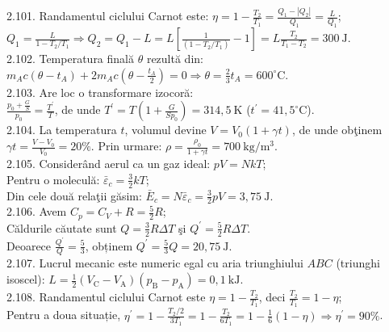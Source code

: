 2.101. Randamentul ciclului Carnot este: $\eta=1-\frac{T_{2}}{T_{1}}=\frac{Q_{1}-\left|Q_{2}\right|}{Q_{1}}=\frac{L}{Q_{1}}$;\\ $Q_{1}=\frac{L}{1-T_{2} / T_{1}} \Rightarrow Q_{2}=Q_{1}-L=L\left[\frac{1}{\left(1-T_{2} / T_{1}\right)}-1\right]=L \frac{T_{2}}{T_{1}-T_{2}}=300 \mathrm{~J}$.\\

2.102. Temperatura finală $\theta$ rezultă din:\\ $m_{A} c\left(\theta-t_{A}\right)+2 m_{A} c\left(\theta-\frac{t_{A}}{2}\right)=0 \Rightarrow \theta=\frac{2}{3} t_{A}=600^{\circ} \mathrm{C}$.\\

2.103. Are loc o transformare izocoră:\\ $\frac{p_{0}+\frac{G}{S}}{p_{0}}=\frac{T^{\prime}}{T}$, de unde $T^{\prime}=T\left(1+\frac{G}{S p_{0}}\right)=314,5 \mathrm{~K}$ ($t^{\prime}=41,5^{\circ} \mathrm{C}$).\\

2.104. La temperatura $t$, volumul devine $V=V_{0}(1+\gamma t)$, de unde obţinem $\gamma t=\frac{V-V_{0}}{V_{0}}=20 \%$. Prin urmare: $\rho=\frac{\rho_{0}}{1+\gamma t}=700 \mathrm{~kg} / \mathrm{m}^{3}$.\\

2.105. Considerând aerul ca un gaz ideal: $p V=N k T$;\\ Pentru o moleculă: $\bar{\varepsilon}_{c}=\frac{3}{2} k T$;\\ Din cele două relaţii găsim: $\bar{E}_{c}=N \bar{\varepsilon}_{c}=\frac{3}{2} p V=3,75 \mathrm{~J}$.\\

2.106. Avem $C_{p}=C_{V}+R=\frac{5}{2} R$;\\ Căldurile căutate sunt $Q=\frac{3}{2} R \Delta T$ şi $Q^{\prime}=\frac{5}{2} R \Delta T$.\\ Deoarece $\frac{Q^{\prime}}{Q}=\frac{5}{3}$, obținem $Q^{\prime}=\frac{5}{3} Q=20,75 \mathrm{~J}$.\\

2.107. Lucrul mecanic este numeric egal cu aria triunghiului $A B C$ (triunghi isoscel): $L=\frac{1}{2}\left(V_{\mathrm{C}}-V_{\mathrm{A}}\right)\left(p_{\mathrm{B}}-p_{\mathrm{A}}\right)=0,1 \mathrm{~kJ}$.\\

2.108. Randamentul ciclului Carnot este $\eta=1-\frac{T_{2}}{T_{1}}$, deci $\frac{T_{2}}{T_{1}}=1-\eta$;\\ Pentru a doua situație, $\eta^{\prime}=1-\frac{T_{2} / 2}{3 T_{1}}=1-\frac{T_{2}}{6 T_{1}}=1-\frac{1}{6}(1-\eta) \Rightarrow \eta^{\prime}=90 \%$.\\

